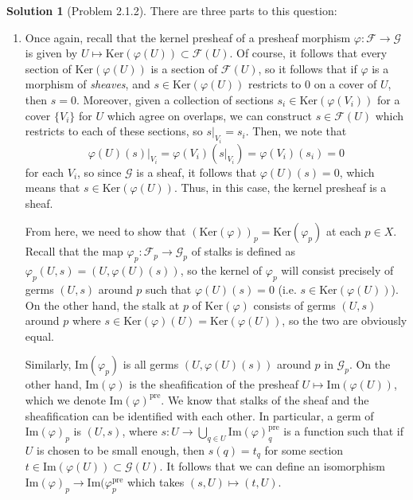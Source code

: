 \documentclass[aps,pra,showpacs,notitlepage,onecolumn,superscriptaddress,nofootinbib]{revtex4-1}
\theoremstyle{definition}
\newtheorem{solution}{Solution}[section]
\begin{document}
\begin{solution}[Problem 2.1.2]
  There are three parts to this question:
  \begin{enumerate}
    \item Once again, recall that the kernel presheaf of a presheaf morphism $\varphi : \mathcal{F} \rightarrow \mathcal{G}$ is given by $U \mapsto \text{Ker}(\varphi(U)) \subset \mathcal{F}(U)$. Of course, it follows that every section
      of $\text{Ker}(\varphi(U))$ is a section of $\mathcal{F}(U)$, so it follows that if $\varphi$ is a morphism of \emph{sheaves}, and $s \in \text{Ker}(\varphi(U))$ restricts to $0$ on a cover of $U$, then $s = 0$. Moreover, given
      a collection of sections $s_i \in \text{Ker}(\varphi(V_i))$ for a cover $\{V_i\}$ for $U$ which agree on overlaps, we can construct $s \in \mathcal{F}(U)$ which restricts to
      each of these sections, so $s|_{V_i} = s_i$. Then, we note that
      \begin{equation}
        \varphi(U)(s)|_{V_i} = \varphi(V_i)(s|_{V_i}) = \varphi(V_i)(s_i) = 0
        \end{equation}
      for each $V_i$, so since $\mathcal{G}$ is a sheaf, it follows that $\varphi(U)(s) = 0$, which means that $s \in \text{Ker}(\varphi(U))$. Thus, in this case, the kernel presheaf is a sheaf.

      From here, we need to show that $(\text{Ker}(\varphi))_p = \text{Ker}(\varphi_p)$ at each $p \in X$. Recall that the map $\varphi_p : \mathcal{F}_p \rightarrow \mathcal{G}_p$ of stalks
      is defined as $\varphi_p(U, s) = (U, \varphi(U)(s))$, so the kernel of $\varphi_p$ will consist precisely of germs $(U, s)$ around $p$ such that $\varphi(U)(s) = 0$ (i.e. $s \in \text{Ker}(\varphi(U))$).
      On the other hand, the stalk at $p$ of $\text{Ker}(\varphi)$ consists of germs $(U, s)$ around $p$ where $s \in \text{Ker}(\varphi)(U) = \text{Ker}(\varphi(U))$, so the two are obviously equal.

      Similarly, $\text{Im}(\varphi_p)$ is all germs $(U, \varphi(U)(s))$ around $p$ in $\mathcal{G}_p$. On the other hand, $\text{Im}(\varphi)$ is the sheafification of the presheaf $U \mapsto \text{Im}(\varphi(U))$, which
      we denote $\text{Im}(\varphi)^{\text{pre}}$.
      We know that stalks of the sheaf and the sheafification can be identified with each other. In particular, a germ of $\text{Im}(\varphi)_p$ is $(U, s)$, where $s : U \rightarrow \bigcup_{q \in U} \text{Im}(\varphi)^{\text{pre}}_q$
      is a function such that if $U$ is chosen to be small enough, then $s(q) = t_q$ for some section $t \in \text{Im}(\varphi(U)) \subset \mathcal{G}(U)$. It follows that we can define an isomorphism
      $\text{Im}(\varphi)_p \rightarrow \text{Im}(\varphi^{\text{pre}}_p$ which takes $(s, U) \mapsto (t, U)$.


\end{enumerate}
\end{solution}
\end{document}
